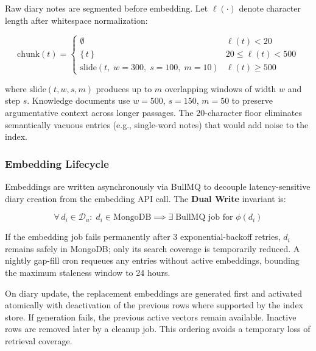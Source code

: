 \documentclass[conference]{IEEEtran}
\begin{document}
Raw diary notes are segmented before embedding. Let $\ell(\cdot)$
denote character length after whitespace normalization:

\begin{equation}
  \mathrm{chunk}(t) =
  \begin{cases}
    \emptyset
      & \ell(t) < 20 \\[2pt]
    \{\,t\,\}
      & 20 \le \ell(t) < 500 \\[2pt]
    \mathrm{slide}(t,\;w{=}300,\;s{=}100,\;m{=}10)
      & \ell(t) \ge 500
  \end{cases}
  \label{eq:chunk}
\end{equation}

\noindent where $\mathrm{slide}(t, w, s, m)$ produces up to $m$
overlapping windows of width $w$ and step $s$. Knowledge documents
use $w{=}500$, $s{=}150$, $m{=}50$ to preserve argumentative context
across longer passages. The 20-character floor eliminates semantically
vacuous entries (e.g., single-word notes) that would add noise to the
index.

\subsubsection{Embedding Lifecycle}
\label{sec:embed}

Embeddings are written asynchronously via BullMQ to decouple
latency-sensitive diary creation from the embedding API call. The
\textbf{Dual Write} invariant is:

\begin{equation}
  \forall\, d_i \in \mathcal{D}_u:\;
  d_i \in \mathrm{MongoDB} \implies
  \exists\;\text{BullMQ job for } \phi(d_i)
\end{equation}

If the embedding job fails permanently after 3 exponential-backoff
retries, $d_i$ remains safely in MongoDB; only its search coverage
is temporarily reduced. A nightly gap-fill cron requeues any entries
without active embeddings, bounding the maximum staleness window to
24 hours.

On diary update, the replacement embeddings are generated first and activated atomically with deactivation of the previous rows where supported by the index store. If generation fails, the previous active vectors remain available. Inactive rows are removed later by a cleanup job. This ordering avoids a temporary loss of retrieval coverage.

\end{document}
